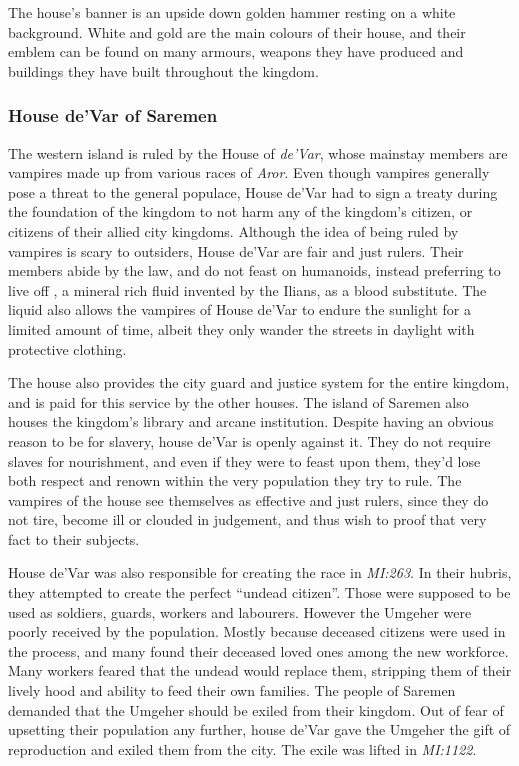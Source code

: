 The house's banner is an upside down golden hammer resting on a white
background. White and gold are the main colours of their house, and their
emblem can be found on many armours, weapons they have produced and buildings
they have built throughout the kingdom.

\subsubsection{House de'Var of Saremen}
\label{sec:House deVar}

The western island is ruled by the House of \emph{de'Var}, whose mainstay
members are vampires made up from various races of \emph{Aror}. Even though
vampires generally pose a threat to the general populace, House de'Var
had to sign a treaty during the foundation of the kingdom to not harm any of
the kingdom's citizen, or citizens of their allied city kingdoms. Although
the idea of being ruled by vampires is scary to outsiders, House de'Var
are fair and just rulers. Their members abide by the law, and do not feast on
humanoids, instead preferring to live off , a mineral rich
fluid invented by the Ilians, as a blood substitute. The liquid also allows the
vampires of House de'Var to endure the sunlight for a limited amount of time,
albeit they only wander the streets in daylight with protective clothing.

The house also provides the city guard and justice system for the entire
kingdom, and is paid for this service by the other houses. The island of
Saremen also houses the kingdom's library and arcane institution. Despite
having an obvious reason to be for slavery, house de'Var is openly against
it. They do not require slaves for nourishment, and even if they were to feast
upon them, they'd lose both respect and renown within the very population they
try to rule. The vampires of the house see themselves as effective and just
rulers, since they do not tire, become ill or clouded in judgement, and
thus wish to proof that very fact to their subjects.

House de'Var was also responsible for creating the race 
in \emph{MI:263}. In their hubris, they attempted to create the perfect
``undead citizen''. Those were supposed to be used as soldiers, guards,
workers and labourers. However the Umgeher were poorly received by the
population. Mostly because deceased citizens were used in the process, and
many found their deceased loved ones among the new workforce. Many workers
feared that the undead would replace them, stripping them of their lively hood
and ability to feed their own families. The people of Saremen demanded that
the Umgeher should be exiled from their kingdom. Out of fear of upsetting
their population any further, house de'Var gave the Umgeher the gift of
reproduction and exiled them from the city. The exile was lifted in
\emph{MI:1122}.

